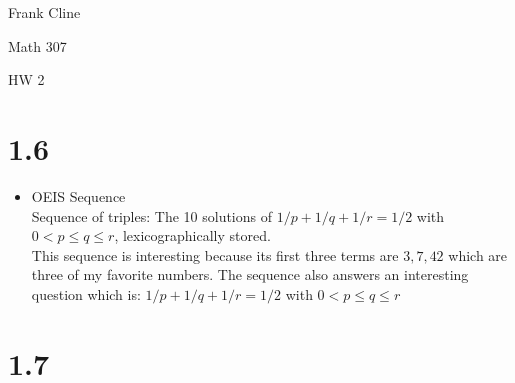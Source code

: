 \documentclass{article}
\begin{document}
\onehalfspacing
\hfill Frank Cline

\hfill Math 307

\hfill HW 2

\section*{1.6} %

\begin{itemize}
\item OEIS Sequence\\
Sequence of triples: The 10 solutions of $1/p+1/q+1/r=1/2$ with $0<p\leq q\leq r$, lexicographically stored.\\
This sequence is interesting because its first three terms are $3,7,42$ which are three of my favorite numbers.
The sequence also answers an interesting question which is: $1/p+1/q+1/r=1/2$ with $0<p\leq q\leq r$\\
\end{itemize}

\section*{1.7} %
\end{document}
